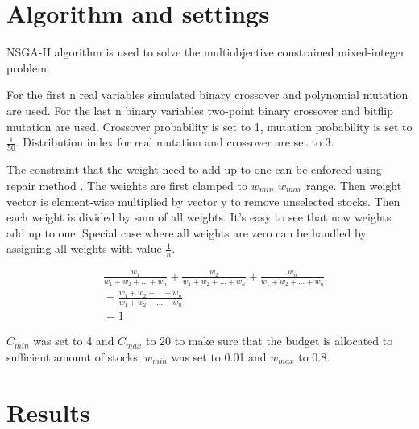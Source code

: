 \documentclass[11pt]{article} %
\begin{document}
\section{Algorithm and settings}

NSGA-II algorithm is used to solve the multiobjective constrained mixed-integer problem. 

For the first n real variables simulated binary crossover and polynomial mutation are used. For the last n binary variables two-point binary crossover and bitflip mutation are used. Crossover probability is set to 1, mutation probability is set to $\frac{1}{50}$. Distribution index for real mutation and crossover are set to 3. 

The constraint that the weight need to add up to one can be enforced using repair method \cite{kaucic2019portfolio}. The weights are first clamped to $w_{min}$ $w_{max}$ range. Then weight vector is element-wise multiplied by vector y to remove unselected stocks. Then each weight is divided by sum of all weights. It's easy to see that now weights add up to one. Special case where all weights are zero can be handled by assigning all weights with value $\frac{1}{n}$.

\begin{equation}
\begin{split}
&\frac{w_1}{w_1 + w_2 + ... + w_n} + \frac{w_2}{w_1 + w_2 + ... + w_n} + \frac{w_n}{w_1 + w_2 + ... + w_n}\\
&= \frac{w_1 + w_2 + ...  +w_n}{w_1 + w_2 + ... + w_n}\\
&= 1
\end{split}
\end{equation}

$C_{min}$ was set to 4 and $C_{max}$ to 20 to make sure that the budget is allocated to sufficient amount of stocks. $w_{min}$ was set to 0.01 and $w_{max}$ to 0.8. 

\section{Results}



\printbibliography %
\end{document}
